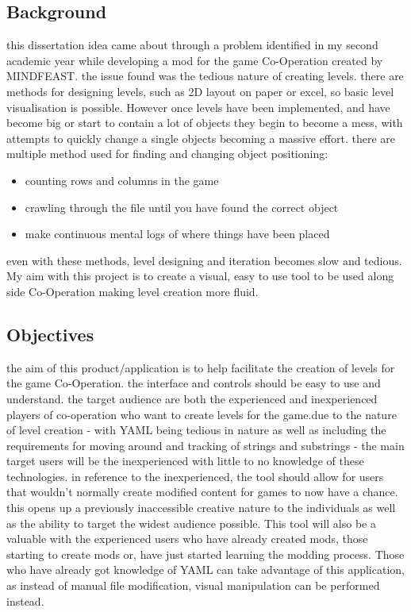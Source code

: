 \subsection{Background}
this dissertation idea came about through a problem identified in my second academic year while developing a mod for the game Co-Operation created by MINDFEAST. the issue found was the tedious nature of creating levels. there are methods for designing levels, such as 2D layout on paper or excel, so basic level visualisation is possible. However once levels have been implemented, and have become big or start to contain a lot of objects they begin to become a mess, with attempts to quickly change a single objects becoming a massive effort. there are multiple method used for finding and changing object positioning:
\begin{itemize}
    \item counting rows and columns in the game 
    \item crawling through the file until you have found the correct object
    \item make continuous mental logs of where things have been placed 
\end{itemize}
even with these methods, level designing and iteration becomes slow and tedious. My aim with this project is to create a visual, easy to use tool to be used along side Co-Operation making level creation more fluid. 
\subsection{Objectives}
the aim of this product/application is to  help facilitate the creation of levels for the game Co-Operation. the interface and controls should be easy to use and understand. the target audience are both the experienced and inexperienced players of co-operation who want to create levels for the game.due to the nature of level creation - with YAML being tedious in nature as well as including the requirements for moving around and tracking of strings and substrings - the main target users will be the inexperienced with little to no knowledge of these technologies. 
in reference to the inexperienced, the tool should allow for users that wouldn't normally create modified content for games to now have a chance. this opens up a previously inaccessible creative nature to the individuals as well as the ability to target the widest audience possible.
This tool will also be a valuable with the experienced users who have already created mods, those starting to create mods or, have just started learning the modding process. Those who have already got knowledge of YAML can take advantage of this application, as instead of manual file modification, visual manipulation can be performed instead.

